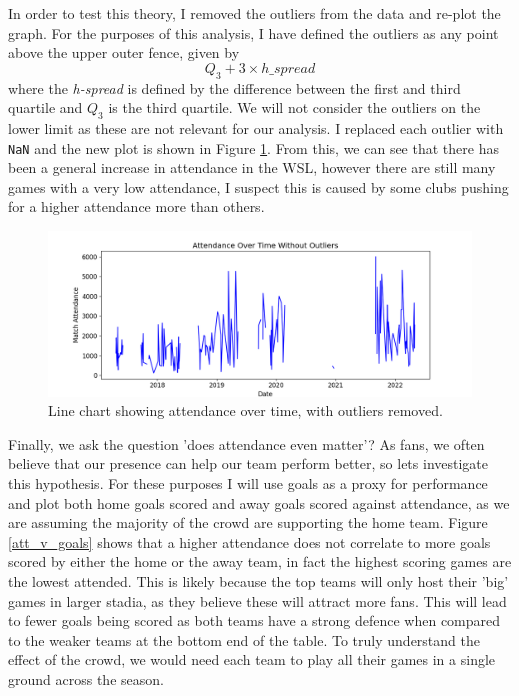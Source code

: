 \documentclass[12pt, a4paper, twocolumn]{article}
\begin{document}
In order to test this theory, I removed the outliers from the data and re-plot the graph. For the purposes of this analysis, I have defined the outliers as any point above the upper outer fence, given by
\begin{equation}
 Q_3 + 3 \times h\_spread
\end{equation}
where the \textit{h-spread} is defined by the difference between the first and third quartile and $Q_3$ is the third quartile. We will not consider the outliers on the lower limit as these are not relevant for our analysis. I replaced each outlier with \verb|NaN| and the new plot is shown in Figure \ref{att_ot_noout}. From this, we can see that there has been a general increase in attendance in the WSL, however there are still many games with a very low attendance, I suspect this is caused by some clubs pushing for a higher attendance more than others.

\begin{figure}
  \includegraphics[width=\linewidth]{../vis/fixtures/attendance_overtime_no_outliers.png}
  \caption{Line chart showing attendance over time, with outliers removed.}
  \label{att_ot_noout}
\end{figure}

Finally, we ask the question 'does attendance even matter'? As fans, we often believe that our presence can help our team perform better, so lets investigate this hypothesis. For these purposes I will use goals as a proxy for performance and plot both home goals scored and away goals scored against attendance, as we are assuming the majority of the crowd are supporting the home team. Figure \ref{att_v_goals} shows that a higher attendance does not correlate to more goals scored by either the home or the away team, in fact the highest scoring games are the lowest attended. This is likely because the top teams will only host their 'big' games in larger stadia, as they believe these will attract more fans. This will lead to fewer goals being scored as both teams have a strong defence when compared to the weaker teams at the bottom end of the table. To truly understand the effect of the crowd, we would need each team to play all their games in a single ground across the season.
\end{document}
